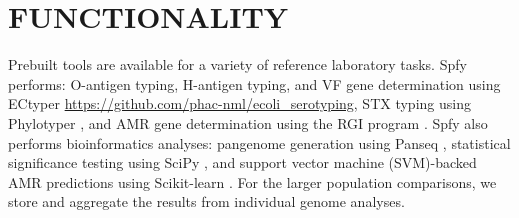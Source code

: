 \documentclass{article}
\begin{document}

\enlargethispage{-65.1pt}



\section{FUNCTIONALITY}

Prebuilt tools are available for a variety of reference laboratory tasks.
Spfy performs: O-antigen typing, H-antigen typing, and VF gene determination using ECtyper \url{https://github.com/phac-nml/ecoli\_serotyping}, STX typing using Phylotyper \cite{whiteside2017phylotyper}, and AMR gene determination using the RGI program \cite{mcarthur2013comprehensive}. Spfy also performs bioinformatics analyses: pangenome generation using Panseq \cite{laing2010pan}, statistical significance testing using SciPy \cite{jones2014scipy}, and support vector machine (SVM)-backed AMR predictions using Scikit-learn \cite{pedregosa2011scikit}.
For the larger population comparisons, we store and aggregate the results from individual genome analyses.

\end{document}
